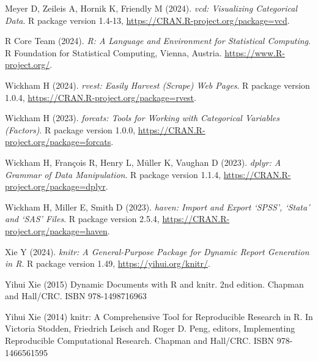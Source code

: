 \documentclass[
]{article}
\begin{document}
Meyer D, Zeileis A, Hornik K, Friendly M (2024). \emph{vcd: Visualizing
Categorical Data}. R package version 1.4-13,
\url{https://CRAN.R-project.org/package=vcd}.

R Core Team (2024). \emph{R: A Language and Environment for Statistical
Computing}. R Foundation for Statistical Computing, Vienna, Austria.
\url{https://www.R-project.org/}.

Wickham H (2024). \emph{rvest: Easily Harvest (Scrape) Web Pages}. R
package version 1.0.4, \url{https://CRAN.R-project.org/package=rvest}.

Wickham H (2023). \emph{forcats: Tools for Working with Categorical
Variables (Factors)}. R package version 1.0.0,
\url{https://CRAN.R-project.org/package=forcats}.

Wickham H, François R, Henry L, Müller K, Vaughan D (2023). \emph{dplyr:
A Grammar of Data Manipulation}. R package version 1.1.4,
\url{https://CRAN.R-project.org/package=dplyr}.

Wickham H, Miller E, Smith D (2023). \emph{haven: Import and Export
`SPSS', `Stata' and `SAS' Files}. R package version 2.5.4,
\url{https://CRAN.R-project.org/package=haven}.

Xie Y (2024). \emph{knitr: A General-Purpose Package for Dynamic Report
Generation in R}. R package version 1.49,
\url{https://yihui.org/knitr/}.

Yihui Xie (2015) Dynamic Documents with R and knitr. 2nd edition.
Chapman and Hall/CRC. ISBN 978-1498716963

Yihui Xie (2014) knitr: A Comprehensive Tool for Reproducible Research
in R. In Victoria Stodden, Friedrich Leisch and Roger D. Peng, editors,
Implementing Reproducible Computational Research. Chapman and Hall/CRC.
ISBN 978-1466561595
\end{document}
